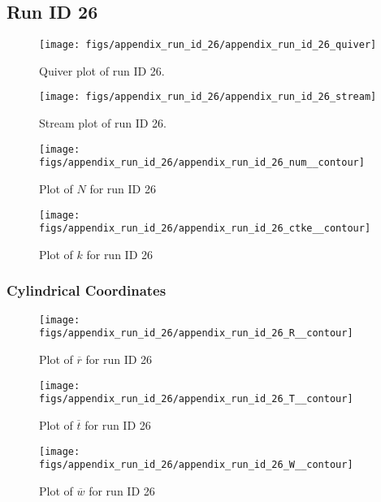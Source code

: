\subsection{Run ID 26}
\begin{figure}[H]
\centering
\texttt{[image: figs/appendix\_run\_id\_26/appendix\_run\_id\_26\_quiver]}
\caption{Quiver plot of run ID 26.}
\label{fig:appendix_run_id_26_quiver}
\end{figure}


\begin{figure}[H]
\centering
\texttt{[image: figs/appendix\_run\_id\_26/appendix\_run\_id\_26\_stream]}
\caption{Stream plot of run ID 26.}
\label{fig:appendix_run_id_26_stream}
\end{figure}


\begin{figure}[H]
\centering
\texttt{[image: figs/appendix\_run\_id\_26/appendix\_run\_id\_26\_num\_\_contour]}
\caption{Plot of $N$ for run ID 26}
\label{fig:appendix_run_id_26_num__contour}
\end{figure}


\begin{figure}[H]
\centering
\texttt{[image: figs/appendix\_run\_id\_26/appendix\_run\_id\_26\_ctke\_\_contour]}
\caption{Plot of $k$ for run ID 26}
\label{fig:appendix_run_id_26_ctke__contour}
\end{figure}


\subsubsection{Cylindrical Coordinates}
\begin{figure}[H]
\centering
\texttt{[image: figs/appendix\_run\_id\_26/appendix\_run\_id\_26\_R\_\_contour]}
\caption{Plot of $\overline{r}$ for run ID 26}
\label{fig:appendix_run_id_26_R__contour}
\end{figure}


\begin{figure}[H]
\centering
\texttt{[image: figs/appendix\_run\_id\_26/appendix\_run\_id\_26\_T\_\_contour]}
\caption{Plot of $\overline{t}$ for run ID 26}
\label{fig:appendix_run_id_26_T__contour}
\end{figure}


\begin{figure}[H]
\centering
\texttt{[image: figs/appendix\_run\_id\_26/appendix\_run\_id\_26\_W\_\_contour]}
\caption{Plot of $\overline{w}$ for run ID 26}
\label{fig:appendix_run_id_26_W__contour}
\end{figure}


